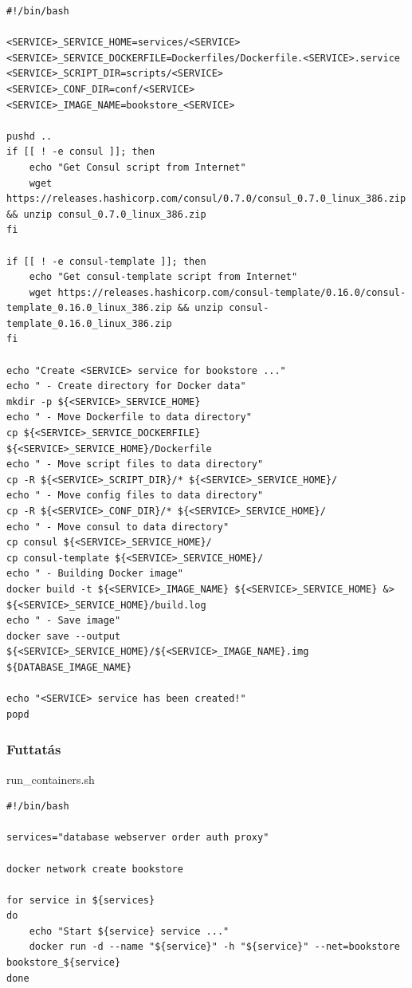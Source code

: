 \documentclass[11pt,magyar,a4paper,twoside,]{report}
\begin{document}
\begin{verbatim}
#!/bin/bash

<SERVICE>_SERVICE_HOME=services/<SERVICE>
<SERVICE>_SERVICE_DOCKERFILE=Dockerfiles/Dockerfile.<SERVICE>.service
<SERVICE>_SCRIPT_DIR=scripts/<SERVICE>
<SERVICE>_CONF_DIR=conf/<SERVICE>
<SERVICE>_IMAGE_NAME=bookstore_<SERVICE>

pushd ..
if [[ ! -e consul ]]; then
    echo "Get Consul script from Internet"
    wget https://releases.hashicorp.com/consul/0.7.0/consul_0.7.0_linux_386.zip && unzip consul_0.7.0_linux_386.zip
fi

if [[ ! -e consul-template ]]; then
    echo "Get consul-template script from Internet"
    wget https://releases.hashicorp.com/consul-template/0.16.0/consul-template_0.16.0_linux_386.zip && unzip consul-template_0.16.0_linux_386.zip
fi

echo "Create <SERVICE> service for bookstore ..."
echo " - Create directory for Docker data"
mkdir -p ${<SERVICE>_SERVICE_HOME}
echo " - Move Dockerfile to data directory"
cp ${<SERVICE>_SERVICE_DOCKERFILE} ${<SERVICE>_SERVICE_HOME}/Dockerfile
echo " - Move script files to data directory"
cp -R ${<SERVICE>_SCRIPT_DIR}/* ${<SERVICE>_SERVICE_HOME}/
echo " - Move config files to data directory"
cp -R ${<SERVICE>_CONF_DIR}/* ${<SERVICE>_SERVICE_HOME}/
echo " - Move consul to data directory"
cp consul ${<SERVICE>_SERVICE_HOME}/
cp consul-template ${<SERVICE>_SERVICE_HOME}/
echo " - Building Docker image"
docker build -t ${<SERVICE>_IMAGE_NAME} ${<SERVICE>_SERVICE_HOME} &> ${<SERVICE>_SERVICE_HOME}/build.log
echo " - Save image"
docker save --output ${<SERVICE>_SERVICE_HOME}/${<SERVICE>_IMAGE_NAME}.img ${DATABASE_IMAGE_NAME}

echo "<SERVICE> service has been created!"
popd
\end{verbatim}

\subsubsection{\texorpdfstring{Futtatás\label{appendix-runner}}{Futtatás}}\label{futtatuxe1s}

run\_containers.sh

\begin{verbatim}
#!/bin/bash

services="database webserver order auth proxy"

docker network create bookstore

for service in ${services}
do
    echo "Start ${service} service ..."
    docker run -d --name "${service}" -h "${service}" --net=bookstore bookstore_${service}
done
\end{verbatim}
\end{document}
